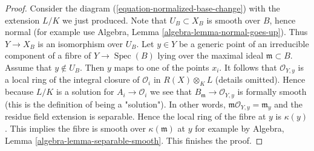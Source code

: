 \documentclass[10pt,a4paper]{amsart}
\theoremstyle{plain}
\theoremstyle{definition}
\theoremstyle{remark}
\numberwithin{equation}{subsection}
\def\Spec{\mathop{\mathrm{Spec}}}
\begin{document}
\begin{proof}
\medskip\noindent
Consider the diagram (\ref{equation-normalized-base-change})
with the extension $L/K$ we just produced. Note that $U_B \subset X_B$
is smooth over $B$, hence normal (for example use
Algebra, Lemma \ref{algebra-lemma-normal-goes-up}).
Thus $Y \to X_B$ is an isomorphism over $U_B$.
Let $y \in Y$ be a generic point of an irreducible
component of a fibre of $Y \to \Spec(B)$ lying over the maximal
ideal $\mathfrak m \subset B$. Assume that $y \not \in U_B$.
Then $y$ maps to one of the points $x_i$. It follows that
$\mathcal{O}_{Y, y}$ is a local ring of the integral closure
of $\mathcal{O}_i$ in $R(X) \otimes_K L$ (details omitted).
Hence because $L/K$ is a solution for
$A_i \to \mathcal{O}_i$ we see that
$B_\mathfrak m \to \mathcal{O}_{Y, y}$ is formally smooth
(this is the definition of being a "solution").
In other words, $\mathfrak m\mathcal{O}_{Y, y} = \mathfrak m_y$
and the residue field extension is separable. Hence the local ring
of the fibre at $y$ is $\kappa(y)$.
This implies the fibre is smooth over $\kappa(\mathfrak m)$
at $y$ for example by Algebra, Lemma \ref{algebra-lemma-separable-smooth}.
This finishes the proof.
\end{proof}
\end{document}

